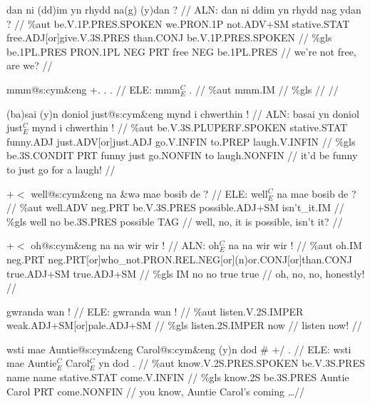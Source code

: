 \documentclass[a4paper,10pt]{article}
\begin{document}
\ex
\begingl[lingstyle=gergl]
\glchat dan ni (dd)im yn rhydd na(g) (y)dan ? //
\glsurface ALN:  dan ni ddim yn rhydd nag ydan ?  //
\glauto \%aut  be{\scriptsize .V.1P.PRES.SPOKEN} we{\scriptsize .PRON.1P} not{\scriptsize .ADV+SM} stative{\scriptsize .STAT} free{\scriptsize .ADJ[or]give.V.3S.PRES} than{\scriptsize .CONJ} be{\scriptsize .V.1P.PRES.SPOKEN}   //
\glmanual \%gls  be{\scriptsize .1PL.PRES} PRON{\scriptsize .1PL} NEG PRT free NEG be{\scriptsize .1PL.PRES}   //
\gleng we're not free, are we? //
\endgl
\xe

\ex
\begingl[lingstyle=gergl]
\glchat mmm@s:cym\&eng +. . . //
\glsurface ELE:  mmm$^{C}_{E}$ .  //
\glauto \%aut  mmm{\scriptsize .IM}   //
\glmanual \%gls     //
\gleng  //
\endgl
\xe

\ex
\begingl[lingstyle=gergl]
\glchat (ba)sai (y)n doniol just@s:cym\&eng mynd i chwerthin ! //
\glsurface ALN:  basai yn doniol just$^{C}_{E}$ mynd i chwerthin !  //
\glauto \%aut  be{\scriptsize .V.3S.PLUPERF.SPOKEN} stative{\scriptsize .STAT} funny{\scriptsize .ADJ} just{\scriptsize .ADV[or]just.ADJ} go{\scriptsize .V.INFIN} to{\scriptsize .PREP} laugh{\scriptsize .V.INFIN}   //
\glmanual \%gls  be{\scriptsize .3S.CONDIT} PRT funny just go{\scriptsize .NONFIN} to laugh{\scriptsize .NONFIN}   //
\gleng it'd be funny to just go for a laugh! //
\endgl
\xe

\ex
\begingl[lingstyle=gergl]
\glchat +$<$ well@s:cym\&eng na \&wǝ mae bosib de ? //
\glsurface ELE:  well$^{C}_{E}$ na mae bosib de ?  //
\glauto \%aut  well{\scriptsize .ADV} neg{\scriptsize .PRT} be{\scriptsize .V.3S.PRES} possible{\scriptsize .ADJ+SM} isn't\_it{\scriptsize .IM}   //
\glmanual \%gls  well no be{\scriptsize .3S.PRES} possible TAG   //
\gleng well, no, it is possible, isn't it? //
\endgl
\xe

\ex
\begingl[lingstyle=gergl]
\glchat +$<$ oh@s:cym\&eng na na wir wir ! //
\glsurface ALN:  oh$^{C}_{E}$ na na wir wir !  //
\glauto \%aut  oh{\scriptsize .IM} neg{\scriptsize .PRT} neg{\scriptsize .PRT[or]who\_not.PRON.REL.NEG[or](n)or.CONJ[or]than.CONJ} true{\scriptsize .ADJ+SM} true{\scriptsize .ADJ+SM}   //
\glmanual \%gls  IM no no true true   //
\gleng oh, no, no, honestly! //
\endgl
\xe

\ex
\begingl[lingstyle=gergl]
\glchat gwranda wan ! //
\glsurface ELE:  gwranda wan !  //
\glauto \%aut  listen{\scriptsize .V.2S.IMPER} weak{\scriptsize .ADJ+SM[or]pale.ADJ+SM}   //
\glmanual \%gls  listen{\scriptsize .2S.IMPER} now   //
\gleng listen now! //
\endgl
\xe

\ex
\begingl[lingstyle=gergl]
\glchat wsti mae Auntie@s:cym\&eng Carol@s:cym\&eng (y)n dod \# +/ . //
\glsurface ELE:  wsti mae Auntie$^{C}_{E}$ Carol$^{C}_{E}$ yn dod .  //
\glauto \%aut  know{\scriptsize .V.2S.PRES.SPOKEN} be{\scriptsize .V.3S.PRES} name name stative{\scriptsize .STAT} come{\scriptsize .V.INFIN}   //
\glmanual \%gls  know{\scriptsize .2S} be{\scriptsize .3S.PRES} Auntie Carol PRT come{\scriptsize .NONFIN}   //
\gleng you know, Auntie Carol's coming \dots  //
\endgl
\xe
\end{document}

